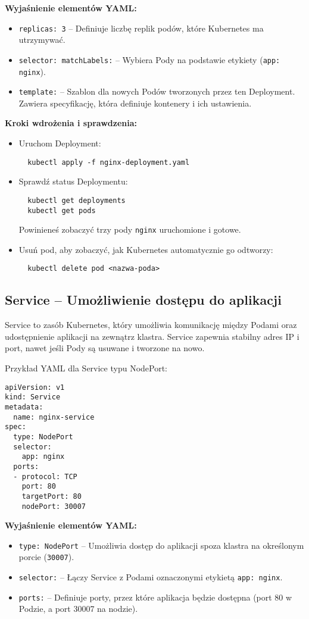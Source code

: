 \documentclass{article}
\begin{document}
\textbf{Wyjaśnienie elementów YAML:}
\begin{itemize}
  \item \texttt{replicas: 3} – Definiuje liczbę replik podów, które Kubernetes ma utrzymywać.
  \item \texttt{selector: matchLabels:} – Wybiera Pody na podstawie etykiety (\texttt{app: nginx}).
  \item \texttt{template:} – Szablon dla nowych Podów tworzonych przez ten Deployment. Zawiera specyfikację, która definiuje kontenery i ich ustawienia.
\end{itemize}

\textbf{Kroki wdrożenia i sprawdzenia:}
\begin{itemize}
  \item Uruchom Deployment:
  \begin{lstlisting}
  kubectl apply -f nginx-deployment.yaml
  \end{lstlisting}
  \item Sprawdź status Deploymentu:
  \begin{lstlisting}
  kubectl get deployments
  kubectl get pods
  \end{lstlisting}
  Powinieneś zobaczyć trzy pody \texttt{nginx} uruchomione i gotowe.
  \item Usuń pod, aby zobaczyć, jak Kubernetes automatycznie go odtworzy:
  \begin{lstlisting}
  kubectl delete pod <nazwa-poda>
  \end{lstlisting}
\end{itemize}

\subsection{Service – Umożliwienie dostępu do aplikacji}
Service to zasób Kubernetes, który umożliwia komunikację między Podami oraz udostępnienie aplikacji na zewnątrz klastra. Service zapewnia stabilny adres IP i port, nawet jeśli Pody są usuwane i tworzone na nowo.

Przykład YAML dla Service typu NodePort:
\begin{lstlisting}
apiVersion: v1
kind: Service
metadata:
  name: nginx-service
spec:
  type: NodePort
  selector:
    app: nginx
  ports:
  - protocol: TCP
    port: 80
    targetPort: 80
    nodePort: 30007
\end{lstlisting}

\textbf{Wyjaśnienie elementów YAML:}
\begin{itemize}
  \item \texttt{type: NodePort} – Umożliwia dostęp do aplikacji spoza klastra na określonym porcie (\texttt{30007}).
  \item \texttt{selector:} – Łączy Service z Podami oznaczonymi etykietą \texttt{app: nginx}.
  \item \texttt{ports:} – Definiuje porty, przez które aplikacja będzie dostępna (port 80 w Podzie, a port 30007 na nodzie).
\end{itemize}
\end{document}
